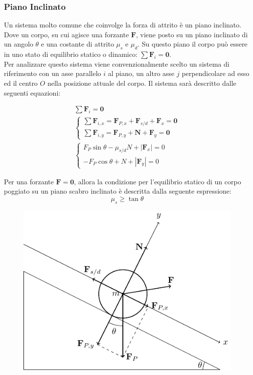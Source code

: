 \documentclass{article}
\newcommand{\vect}[1]{\boldsymbol{\mathbf{#1}}}
\numberwithin{equation}{subsection}
\begin{document}
\subsubsection{Piano Inclinato}
Un sistema molto comune che coinvolge la forza di attrito 
è un piano inclinato. Dove un corpo, su cui agisce una forzante 
$\vect{F}$, viene posto su un piano inclinato 
di un angolo $\theta$ e una costante di attrito $\mu_s$ e 
$\mu_d$. Su questo piano il corpo può essere in uno stato di 
equilibrio statico o dinamico: $\sum\vect{F}_i=\vect{0}$.\\
Per analizzare questo sistema viene convenzionalmente scelto 
un sistema di riferimento con un asse parallelo $i$ al piano, 
un altro asse $j$ perpendicolare ad esso ed il centro $O$ 
nella posizione attuale del corpo.
Il sistema sarà descritto dalle seguenti equazioni:

\begin{gather*}
    \sum\vect{F}_i=\vect{0}\\
    \begin{cases}
        \sum\vect{F}_{i,x}=\vect{F}_{P,x}+\vect{F}_{s/d}+\vect{F}_x=\vect{0}\\
        \sum\vect{F}_{i,y}=\vect{F}_{P,y}+\vect{N}+\vect{F}_y=\vect{0}
    \end{cases}\\
    \begin{cases}
        F_P\sin\theta-\mu_{s/d}N+\left|\vect{F}_x\right|=0\\
        -F_P\cos\theta+N+\left|\vect{F}_y\right|=0
    \end{cases}
\end{gather*}

Per una forzante $\vect F=\vect0$, allora la condizione per l'equilibrio statico di un corpo poggiato su un piano scabro inclinato è descritta dalla seguente espressione:
\begin{equation}
    \mu_s\geq\tan\theta
\end{equation}

\begin{figure}[H]%
    \centering 
    \includegraphics{piano-inclinato.pdf}%
\end{figure}
\end{document}
